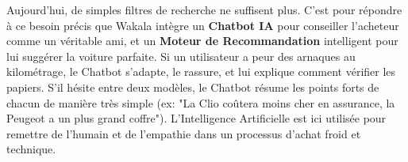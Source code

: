 \documentclass[a4paper, 11pt]{article}
\begin{document}
Aujourd'hui, de simples filtres de recherche ne suffisent plus. C'est pour répondre à ce besoin précis que Wakala intègre un \textbf{Chatbot IA} pour conseiller l'acheteur comme un véritable ami, et un \textbf{Moteur de Recommandation} intelligent pour lui suggérer la voiture parfaite. 
Si un utilisateur a peur des arnaques au kilométrage, le Chatbot s'adapte, le rassure, et lui explique comment vérifier les papiers. S'il hésite entre deux modèles, le Chatbot résume les points forts de chacun de manière très simple (ex: "La Clio coûtera moins cher en assurance, la Peugeot a un plus grand coffre"). L'Intelligence Artificielle est ici utilisée pour remettre de l'humain et de l'empathie dans un processus d'achat froid et technique.
\end{document}
